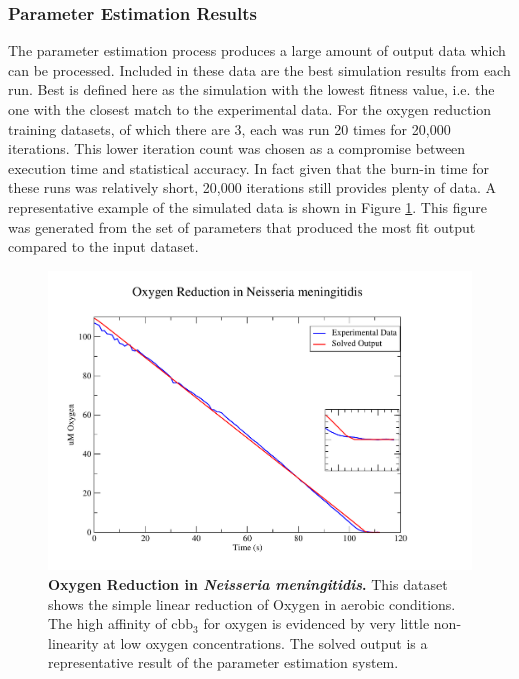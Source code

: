 \subsubsection{Parameter Estimation Results}
The parameter estimation process produces a large amount of output data which can be processed. Included in these data are the best simulation results from each run. Best is defined here as the simulation with the lowest fitness value, i.e. the one with the closest match to the experimental data. For the oxygen reduction training datasets, of which there are 3, each was run 20 times for 20,000 iterations. This lower iteration count was chosen as a compromise between execution time and statistical accuracy. In fact given that the burn-in time for these runs was relatively short, 20,000 iterations still provides plenty of data. A representative example of the simulated data is shown in Figure \ref{fig:o2sim}. This figure was generated from the set of parameters that produced the most fit output compared to the input dataset.

\begin{figure}[tbp]
 \centering
 \includegraphics[width=14cm, trim=2cm 1cm 4cm 1cm]{./05-oxygenreduction/data/o2sim.pdf}
 \caption[{Oxygen Reduction in \textit{Neisseria meningitidis}.}]{{\bf Oxygen Reduction in \textit{Neisseria meningitidis}.} This dataset shows the simple linear reduction of Oxygen in aerobic conditions. The high affinity of $\mathrm{cbb}_3$ for oxygen is evidenced by very little non-linearity at low oxygen concentrations. The solved output is a representative result of the parameter estimation system.
 \label{fig:o2sim}}
\end{figure}

